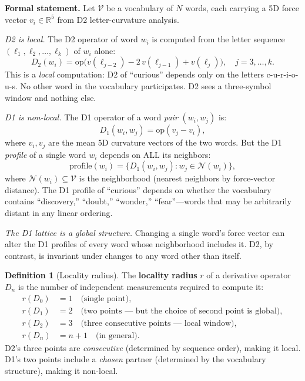 \documentclass[11pt]{article}
\theoremstyle{definition}
\newtheorem{definition}[theorem]{Definition}
\theoremstyle{remark}
\begin{document}
\textbf{Formal statement.}
Let $\mathcal{V}$ be a vocabulary of $N$ words, each carrying a 5D force vector
$v_i \in \mathbb{R}^5$ from D2 letter-curvature analysis.

\emph{D2 is local.}
The D2 operator of word $w_i$ is computed from the letter sequence
$(\ell_1, \ell_2, \ldots, \ell_k)$ of $w_i$ alone:
\[
  D_2(w_i) = \mathrm{op}\bigl(v(\ell_{j-2}) - 2\,v(\ell_{j-1}) + v(\ell_j)\bigr),
  \quad j = 3, \ldots, k.
\]
This is a \emph{local} computation: D2 of ``curious'' depends only on the
letters c-u-r-i-o-u-s.  No other word in the vocabulary participates.  D2
sees a three-symbol window and nothing else.

\emph{D1 is non-local.}
The D1 operator of a word \emph{pair} $(w_i, w_j)$ is:
\[
  D_1(w_i, w_j) = \mathrm{op}(v_j - v_i),
\]
where $v_i, v_j$ are the mean 5D curvature vectors of the two words.  But
the D1 \emph{profile} of a single word $w_i$ depends on ALL its neighbors:
\[
  \mathrm{profile}(w_i) = \bigl\{ D_1(w_i, w_j) : w_j \in \mathcal{N}(w_i) \bigr\},
\]
where $\mathcal{N}(w_i) \subseteq \mathcal{V}$ is the neighborhood (nearest
neighbors by force-vector distance).  The D1 profile of ``curious'' depends
on whether the vocabulary contains ``discovery,'' ``doubt,'' ``wonder,''
``fear''---words that may be arbitrarily distant in any linear ordering.

\emph{The D1 lattice is a global structure.}
Changing a single word's force vector can alter the D1 profiles of every word
whose neighborhood includes it.  D2, by contrast, is invariant under changes
to any word other than itself.

\begin{definition}[Locality radius]
\label{def:locality-radius}
The \textbf{locality radius} $r$ of a derivative operator $D_n$ is the number
of independent measurements required to compute it:
\begin{align}
  r(D_0) &= 1 \quad\text{(single point)}, \\
  r(D_1) &= 2 \quad\text{(two points --- but the choice of second point is global)}, \\
  r(D_2) &= 3 \quad\text{(three consecutive points --- local window)}, \\
  r(D_n) &= n + 1 \quad\text{(in general)}.
\end{align}
D2's three points are \emph{consecutive} (determined by sequence order), making
it local.  D1's two points include a \emph{chosen} partner (determined by the
vocabulary structure), making it non-local.
\end{definition}
\end{document}
